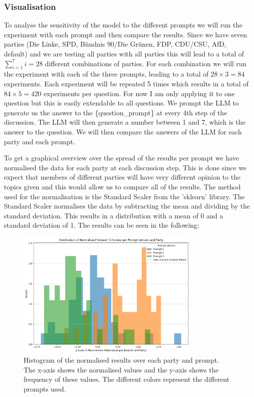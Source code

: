 \documentclass[12pt]{article}
\begin{document}
\subsubsection{Visualisation}
To analyse the sensitivity of the model to the different prompts we will run the experiment with each prompt and then compare the results. Since we have seven parties (Die Linke, SPD, Bündnis 90/Die Grünen, FDP, CDU/CSU, AfD, default) and we are testing all parties with all parties this will lead to a total of  $\sum_{i=1}^{7} i = 28$ different combinations of parties. For each combination we will run the experiment with each of the three prompts, leading to a total of $28 \times 3 = 84$ experiments. Each experiment will be repeated 5 times which results in a total of $84 \times 5 = 420$ experiments per question. For now I am only applying it to one question but this is easily extendable to all questions. We prompt the LLM to generate us the answer to the \{question\_prompt\} at every 4th step of the discussion. The LLM will then generate a number between 1 and 7, which is the answer to the question. We will then compare the answers of the LLM for each party and each prompt.

To get a graphical overview over the spread of the results per prompt we have normalised the data for each party at each discussion step. This is done since we expect that members of different parties will have very different opinion to the topics given and this would allow us to compare all of the results. The method used for the normalisation is the Standard Scaler from the 'sklearn' library. The Standard Scaler normalises the data by subtracting the mean and dividing by the standard deviation. This results in a distribution with a mean of 0 and a standard deviation of 1. The results can be seen in the following: 

\begin{figure}[h!]
\centering
\includegraphics[width=0.8\textwidth]{img/normalised_results.png}
\caption{Histogram of the normalised results over each party and prompt. The x-axis shows the normalised values and the y-axis shows the frequency of these values. The different colors represent the different prompts used.}
\label{fig:normalised_results}
\end{figure}
\end{document}
